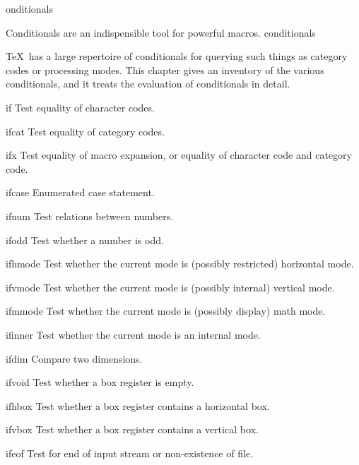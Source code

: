 \subject[if] Conditionals

Conditionals are an indispensible tool for powerful macros.
\term conditionals\par
\TeX\ has a large repertoire of conditionals for querying
such things as category codes or processing modes.
This chapter gives an inventory of the various conditionals,
and it treats the evaluation of
conditionals in detail.

\invent
\item if 
      Test equality of character codes. 

\item ifcat 
      Test equality of category codes. 

\item ifx 
      Test equality of macro expansion, or equality of character code and
      category code.

\item ifcase 
      Enumerated case statement.

\item ifnum 
      Test relations between numbers.

\item ifodd 
      Test whether a number is odd.

\item ifhmode 
      Test whether the current mode is (possibly restricted) horizontal mode.

\item ifvmode 
      Test whether the current mode is (possibly internal) vertical mode.

\item ifmmode 
     Test whether the current mode is (possibly display) math mode.

\item ifinner 
      Test whether the current mode is an internal mode.

\item ifdim 
      Compare two dimensions. 

\item ifvoid 
      Test whether a box register is empty.

\item ifhbox 
      Test whether a box register contains a horizontal box.

\item ifvbox 
      Test whether a box register contains a vertical box. 

\item ifeof 
      Test for end of input stream or non-existence of file.

